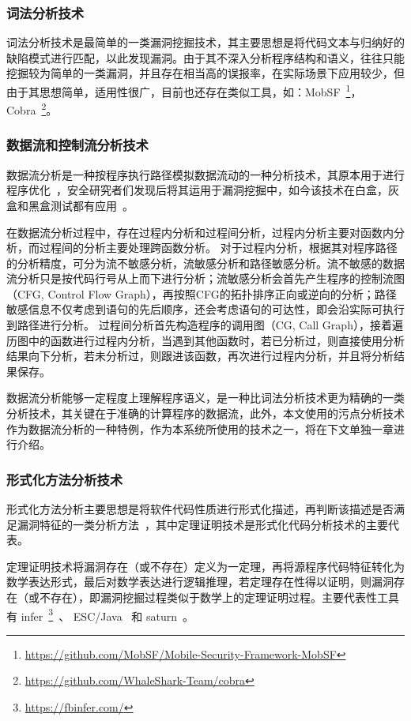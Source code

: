 \subsubsection{词法分析技术}
词法分析技术是最简单的一类漏洞挖掘技术，其主要思想是将代码文本与归纳好的缺陷模式进行匹配，以此发现漏洞。由于其不深入分析程序结构和语义，往往只能挖掘较为简单的一类漏洞，并且存在相当高的误报率，在实际场景下应用较少，但由于其思想简单，适用性很广，目前也还存在类似工具，如：MobSF~\footnote{\url{https://github.com/MobSF/Mobile-Security-Framework-MobSF}}，Cobra~\footnote{\url{https://github.com/WhaleShark-Team/cobra}}。\\

\subsubsection{数据流和控制流分析技术}
数据流分析是一种按程序执行路径模拟数据流动的一种分析技术，其原本用于进行程序优化~\cite{Kildall1973}，安全研究者们发现后将其运用于漏洞挖掘中，如今该技术在白盒，灰盒和黑盒测试都有应用~\cite{Shastry2016}。

在数据流分析过程中，存在过程内分析和过程间分析，过程内分析主要对函数内分析，而过程间的分析主要处理跨函数分析。
对于过程内分析，根据其对程序路径的分析精度，可分为流不敏感分析，流敏感分析和路径敏感分析。流不敏感的数据流分析只是按代码行号从上而下进行分析；流敏感分析会首先产生程序的控制流图（CFG, Control Flow Graph），再按照CFG的拓扑排序正向或逆向的分析；路径敏感信息不仅考虑到语句的先后顺序，还会考虑语句的可达性，即会沿实际可执行到路径进行分析。
过程间分析首先构造程序的调用图（CG, Call Graph），接着遍历图中的函数进行过程内分析，当遇到其他函数时，若已分析过，则直接使用分析结果向下分析，若未分析过，则跟进该函数，再次进行过程内分析，并且将分析结果保存。

数据流分析能够一定程度上理解程序语义，是一种比词法分析技术更为精确的一类分析技术，其关键在于准确的计算程序的数据流，此外，本文使用的污点分析技术作为数据流分析的一种特例，作为本系统所使用的技术之一，将在下文单独一章进行介绍。\\

\subsubsection{形式化方法分析技术}
形式化方法分析主要思想是将软件代码性质进行形式化描述，再判断该描述是否满足漏洞特征的一类分析方法~\cite{B:automatedTheoremProving}，其中定理证明技术是形式化代码分析技术的主要代表。

定理证明技术将漏洞存在（或不存在）定义为一定理，再将源程序代码特征转化为数学表达形式，最后对数学表达进行逻辑推理，若定理存在性得以证明，则漏洞存在（或不存在），即漏洞挖掘过程类似于数学上的定理证明过程。主要代表性工具有 infer~\footnote{\url{https://fbinfer.com/}}~\cite{atp:infer}、 ESC/Java~\cite{atp:escjava} 和 saturn~\cite{atp:saturn}。

